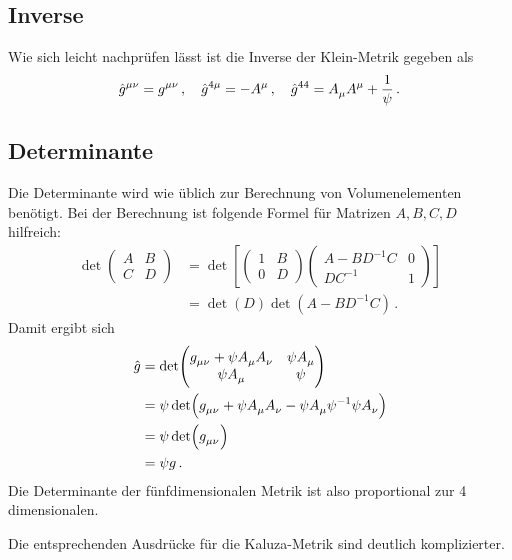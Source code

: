 \subsection{Inverse}
Wie sich leicht nachprüfen lässt ist die Inverse der Klein-Metrik gegeben als
\begin{equation}
\tensor{\hat{g}}{^\mu^\nu}=\tensor{g}{^\mu^\nu}\,,\quad
\tensor{\hat{g}}{^4^\mu}=-\tensor{A}{^\mu}\,,\quad
\tensor{\hat{g}}{^4^4}=\tensor{A}{_\mu}\tensor{A}{^\mu}+\frac{1}{\psi}\,.
\end{equation}
\subsection{Determinante}
Die Determinante wird wie üblich zur Berechnung von Volumenelementen benötigt.
Bei der Berechnung ist folgende Formel für Matrizen $A,B,C,D$ hilfreich:
\begin{equation}
\begin{split}
\det\begin{pmatrix}A& B\\ C& D\end{pmatrix}&=\det\left[
\begin{pmatrix}1& B\\0& D\end{pmatrix}\begin{pmatrix}A-BD^{-1}C& 0\\DC^{-1
}& 1\end{pmatrix} \right]\\
&= \det(D) \det\left(A - B D^{-1}
C\right)\,.
\end{split}
\end{equation}
Damit ergibt sich 
\begin{equation}
\begin{split}
 \hat{g}&=
 \det\begin{pmatrix}\tensor{g}{_\mu_\nu}+\psi\tensor{A}{_\mu}\tensor{A}{_\nu}
 &\psi \tensor{A}{_\mu}\\
 \psi \tensor{A}{_\mu}	 & \psi
 \end{pmatrix}\\
 &=\psi
 \det\left(\tensor{g}{_\mu_\nu}+\psi\tensor{A}{_\mu}\tensor{A}{_\nu}
 -\psi\tensor{A}{_\mu}\psi^{-1}\psi\tensor{A}{_\nu}\right)\\
 &=\psi \det\left(\tensor{g}{_\mu_\nu}\right)\\
 &=\psi g\,.
\end{split}
\end{equation}
Die Determinante der fünfdimensionalen Metrik ist also proportional zur 4
dimensionalen. 
\begin{bemerkung}
Die entsprechenden Ausdrücke für die Kaluza-Metrik sind deutlich komplizierter.
\end{bemerkung}
